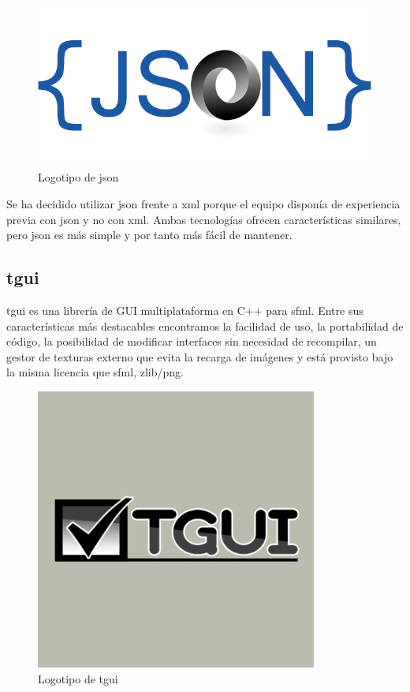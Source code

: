 		\begin{figure}[!htp]
			 \centering
			 \includegraphics[scale=.5]{fig/json}
			 \caption{Logotipo de \acrshort{json}}
			 \label{fig:json}
		\end{figure}

		\FloatBarrier

		Se ha decidido utilizar \acrshort{json} frente a \acrshort{xml} porque el equipo disponía de experiencia previa con \acrshort{json} y no con \acrshort{xml}. Ambas tecnologías ofrecen características similares, pero \acrshort{json} es más simple y por tanto más fácil de mantener.

	\subsection{\acrshort{tgui}}

		\acrfull{tgui} es una librería de GUI multiplataforma en C++ para \acrshort{sfml}. Entre sus características más destacables encontramos la facilidad de uso, la portabilidad de código, la posibilidad de modificar interfaces sin necesidad de recompilar, un gestor de texturas externo que evita la recarga de imágenes y está provisto bajo la misma licencia que \acrshort{sfml}, zlib/png.

		\begin{figure}[!htp]
			 \centering
			 \includegraphics[scale=.75]{fig/tgui}
			 \caption{Logotipo de \acrshort{tgui}}
			 \label{fig:tgui}
		\end{figure}

